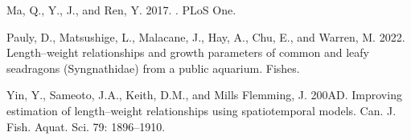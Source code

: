 \documentclass[12pt]{article}\usepackage[]{graphicx}\usepackage[]{color}
\begin{document}
\begin{CSLReferences}{1}{0}
Ma, Q., Y., J., and Ren, Y. 2017. . PLoS One.

Pauly, D., Matsushige, L., Malacane, J., Hay, A., Chu, E., and Warren, M. 2022. Length--weight relationships and growth parameters of common and leafy seadragons ({S}yngnathidae) from a public aquarium. Fishes.

Yin, Y., Sameoto, J.A., Keith, D.M., and Mills Flemming, J. 200AD. Improving estimation of length--weight relationships using spatiotemporal models. Can. J. Fish. Aquat. Sci. 79: 1896--1910.

\end{CSLReferences}
\end{document}
